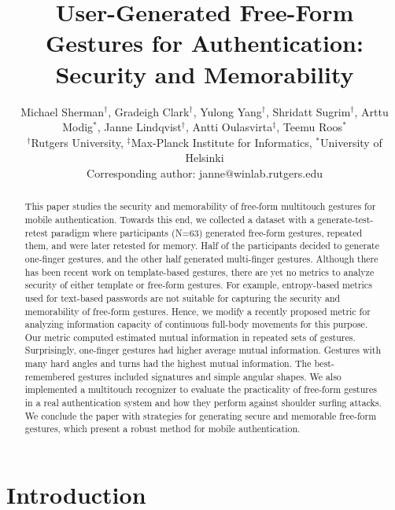\documentclass{sig-alternate-10pt}
\begin{document}
\title{User-Generated Free-Form Gestures for Authentication: Security and Memorability}

\author{
  \alignauthor Michael Sherman$^\dagger$, Gradeigh Clark$^\dagger$, Yulong Yang$^\dagger$, Shridatt Sugrim$^\dagger$, Arttu Modig$^\ast$, Janne Lindqvist$^\dagger$, Antti Oulasvirta$^\ddagger$, Teemu Roos$^\ast$ \\
  $^\dagger$Rutgers University, $^\ddagger$Max-Planck Institute for Informatics, $^\ast$University of Helsinki \\ Corresponding author: janne$@$winlab.rutgers.edu \\
  }

\maketitle

\begin{abstract}
This paper studies the security and memorability of free-form multitouch gestures for mobile authentication. Towards this end, we collected a dataset with a generate-test-retest paradigm where participants (N=63) generated free-form gestures, repeated them, and were later retested for memory. Half of the participants decided to generate one-finger gestures, and the other half generated multi-finger gestures. Although there has been recent work on template-based gestures, there are yet no metrics to analyze security of either template or free-form gestures. For example, entropy-based metrics used for text-based passwords are not suitable for capturing the security and memorability of free-form gestures. Hence, we modify a recently proposed metric for analyzing information capacity of continuous full-body movements for this purpose.  Our metric computed estimated mutual information in repeated sets of gestures. Surprisingly, one-finger gestures had higher average mutual information. Gestures with many hard angles and turns had the highest mutual information. The best-remembered gestures included signatures and simple angular shapes.  We also implemented a multitouch recognizer to evaluate the practicality of free-form gestures in a real authentication system and how they perform against shoulder surfing attacks. We conclude the paper with strategies for generating secure and memorable free-form gestures, which present a robust method for mobile authentication.
\end{abstract}




\section{Introduction}
\end{document}
